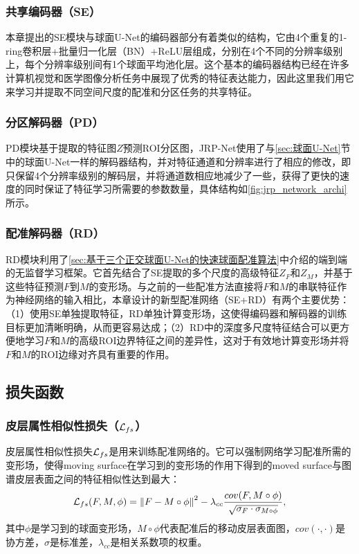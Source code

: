 \subsubsection{共享编码器（SE）}
本章提出的SE模块与球面U-Net的编码器部分有着类似的结构，它由4个重复的1-ring卷积层+批量归一化层（BN）+ReLU层组成，分别在4个不同的分辨率级别上，每个分辨率级别间有1个球面平均池化层。这个基本的编码器结构已经在许多计算机视觉和医学图像分析任务中展现了优秀的特征表达能力\cite{ronneberger2015u}，因此这里我们用它来学习并提取不同空间尺度的配准和分区任务的共享特征。

\subsubsection{分区解码器（PD）}
PD模块基于提取的特征图$Z$预测ROI分区图，JRP-Net使用了与\ref{sec:球面U-Net}节中的球面U-Net一样的解码器结构，并对特征通道和分辨率进行了相应的修改，即只保留4个分辨率级别的解码层，并将通道数相应地减少了一些，获得了更快的速度的同时保证了特征学习所需要的参数数量，具体结构如\ref{fig:jrp_network_archi}所示。

\subsubsection{配准解码器（RD）}
RD模块利用了\ref{sec:基于三个正交球面U-Net的快速球面配准算法}中介绍的端到端的无监督学习框架。它首先结合了SE提取的多个尺度的高级特征$Z_F$和$Z_M$，并基于这些特征预测$F$到$M$的变形场。与之前的一些配准方法\cite{cheng2020cortical}直接将$F$和$M$的串联特征作为神经网络的输入相比，本章设计的新型配准网络（SE+RD）有两个主要优势：（1）使用SE单独提取特征，RD单独计算变形场，这使得编码器和解码器的训练目标更加清晰明确，从而更容易达成；（2）RD中的深度多尺度特征结合可以更方便地学习$F$和$M$的高级ROI边界特征之间的差异性，这对于有效地计算变形场并将$F$和$M$的ROI边缘对齐具有重要的作用\cite{liu2019probabilistic}。


\subsection{损失函数}\label{sec:同时分区与配准的损失函数}
\subsubsection{皮层属性相似性损失（${\cal L}_{fs}$）}
皮层属性相似性损失${\cal L}_{fs}$是用来训练配准网络的。它可以强制网络学习配准所需的变形场，使得moving surface在学习到的变形场的作用下得到的moved surface与图谱皮层表面之间的特征相似性达到最大：
\begin{equation}\label{eq:4.1}
{\cal L}_{fs}(F,M,\phi)={\| F-M\circ \phi \|}^2 -\lambda_{cc}\frac{cov(F,M\circ \phi)}{\sqrt{\sigma_F \cdot \sigma_{M\circ \phi}}},
\end{equation}
其中$\phi$是学习到的球面变形场，$M\circ \phi$代表配准后的移动皮层表面图，$cov(\cdot,\cdot)$是协方差，$\sigma$是标准差，$\lambda_{cc}$是相关系数项的权重。

